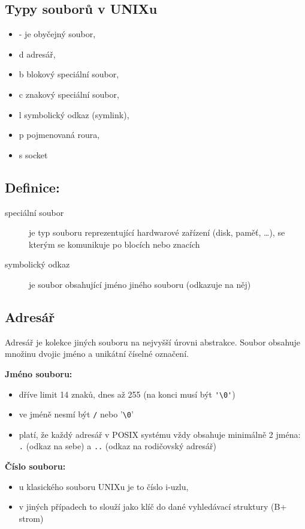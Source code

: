 \documentclass[a4paper, 11pt]{article}
\begin{document}
\subsection{Typy souborů v UNIXu}
\begin{itemize}
    \item - je obyčejný soubor,
    \item d adresář,
    \item b blokový speciální soubor,
    \item c znakový speciální soubor,
    \item l symbolický odkaz (symlink),
    \item p pojmenovaná roura,
    \item s socket
\end{itemize}

\subsection*{Definice:}
\begin{description}
\item[speciální soubor] je typ souboru reprezentující hardwarové zařízení (disk, paměť, \ldots), se kterým se komunikuje po blocích nebo znacích

\item[symbolický odkaz] je soubor obsahující jméno jiného souboru (odkazuje na něj)
\end{description}

\subsection{Adresář}
Adresář je kolekce jiných souboru na nejvyšší úrovni abstrakce. Soubor obsahuje množinu dvojic jméno a unikátní číselné označení.

\textbf{Jméno souboru:}
\begin{itemize}
\item dříve limit 14 znaků, dnes až 255 (na konci musí být \verb|'\0'|)
\item ve jméně nesmí být \verb|/| nebo '\verb|\0|'
\item platí, že každý adresář v POSIX systému vždy obsahuje minimálně 2 jména: \verb|.| (odkaz na sebe) a \verb|..| (odkaz na rodičovský adresář)
\end{itemize}

\textbf{Číslo souboru:}
\begin{itemize}
\item u klasického souboru UNIXu je to číslo i-uzlu,
\item v jiných případech to slouží jako klíč do dané vyhledávací struktury (B+ strom) \\
\end{itemize}
\end{document}

